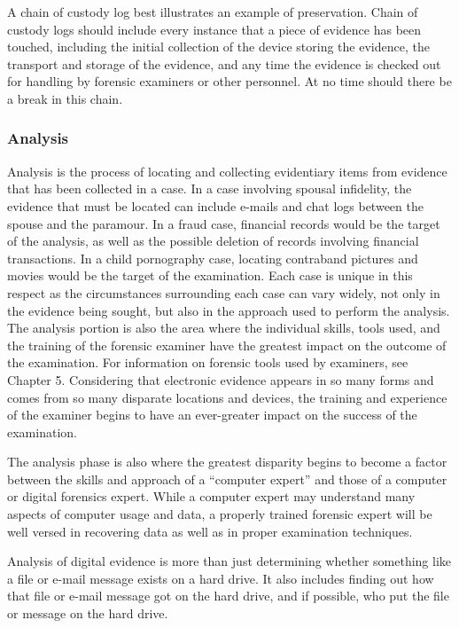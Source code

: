 A chain of custody log best illustrates an example of preservation. Chain
of custody logs should include every instance that a piece of evidence has been
touched, including the initial collection of the device storing the evidence, the
transport and storage of the evidence, and any time the evidence is checked out for
handling by forensic examiners or other personnel. At no time should there be a
break in this chain.

\subsubsection{Analysis}

Analysis is the process of locating and collecting evidentiary items from evidence
that has been collected in a case. In a case involving spousal infidelity, the evidence
that must be located can include e-mails and chat logs between the spouse and the
paramour. In a fraud case, financial records would be the target of the analysis, as
well as the possible deletion of records involving financial transactions. In a child
pornography case, locating contraband pictures and movies would be the target of
the examination. Each case is unique in this respect as the circumstances surrounding
each case can vary widely, not only in the evidence being sought, but also in the
approach used to perform the analysis. The analysis portion is also the area where
the individual skills, tools used, and the training of the forensic examiner have
the greatest impact on the outcome of the examination. For information on forensic
tools used by examiners, see Chapter 5. Considering that electronic evidence
appears in so many forms and comes from so many disparate locations and devices,
the training and experience of the examiner begins to have an ever-greater impact
on the success of the examination.

The analysis phase is also where the greatest disparity begins to become a factor
between the skills and approach of a “computer expert” and those of a computer or
digital forensics expert. While a computer expert may understand many aspects of
computer usage and data, a properly trained forensic expert will be well versed in
recovering data as well as in proper examination techniques.

Analysis of digital evidence is more than just determining whether something
like a file or e-mail message exists on a hard drive. It also includes finding out how
that file or e-mail message got on the hard drive, and if possible, who put the file or
message on the hard drive.

